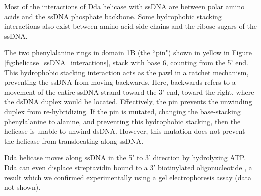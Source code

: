 Most of the interactions of Dda helicase with ssDNA are between polar amino acids and the ssDNA phosphate backbone.  Some hydrophobic stacking interactions also exist between amino acid side chains and the ribose sugars of the ssDNA. \citep{He2012}

The two phenylalanine rings in domain 1B (the ``pin") shown in yellow in Figure \ref{fig:helicase_ssDNA_interactions}, stack with base 6, counting from the 5' end.  This hydrophobic stacking interaction acts as the pawl in a ratchet mechanism, preventing the ssDNA from moving backwards.  Here, backwards refers to a movement of the entire ssDNA strand toward the 3' end, toward the right, where the dsDNA duplex would be located.  Effectively, the pin prevents the unwinding duplex from re-hybridizing.  If the pin is mutated, changing the base-stacking phenylalanine to alanine, and preventing this hydrophobic stacking, then the helicase is unable to unwind dsDNA.  However, this mutation does not prevent the helicase from translocating along ssDNA. \citep{He2012}

Dda helicase moves along ssDNA in the 5' to 3' direction by hydrolyzing ATP.  Dda can even displace streptavidin bound to a 3' biotinylated oligonucleotide \citep{Morris1999}, a result which we confirmed experimentally using a gel electrophoresis assay (data not shown). %


